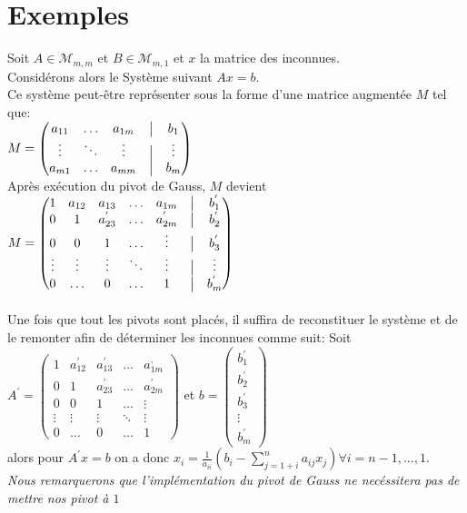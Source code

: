 \section{Exemples}
Soit $A \in \mathcal{M}_{m,m}$ et $B \in \mathcal{M}_{m,1}$ et $x$ la matrice des inconnues. \\
Considérons alors le Système suivant $Ax=b$.\\
Ce système peut-être représenter sous la forme d'une matrice augmentée $M$ tel que:\\
$
M =  \begin{pmatrix}
a_{11}& \ldots & a_{1m} &\bigm| & b_{1} \\
\vdots & \ddots & \vdots&\bigm| &  \vdots \\
a_{m1} & \ldots & a_{mm} &\bigm|& b_{m} 
\end{pmatrix}
$
\\
Après exécution du pivot de Gauss, $M$ devient \\
$
M =  \begin{pmatrix}
1& a_{12}& a_{13} &\ldots & a_{1m} &\bigm| & b_{1}^{'} \\
0 & 1 & a_{23}^{'}&  \ldots &a_{2m}^{'} &\bigm| & b_{2}^{'} \\
0 & 0 & 1 & \ldots &\vdots &\bigm| & b_{3}^{'} \\
\vdots & \vdots & \vdots& \ddots& \vdots &\bigm| &  \vdots \\
0 & \ldots &0 &\ldots &1&\bigm|& b_{m}^{'}
\end{pmatrix}
$  \\ \\
Une fois que tout les pivots sont placés, il suffira de reconstituer le système et de le remonter afin de déterminer les inconnues comme suit:
Soit $A^{'}=  \begin{pmatrix}
1& a_{12}^{'}& a_{13}^{'} &\ldots & a_{1m}^{,} \\
0 & 1 & a_{23}^{'}&  \ldots &a_{2m}^{'} \\
0 & 0 & 1 & \ldots &\vdots\\
\vdots & \vdots & \vdots& \ddots& \vdots \\
0 & \ldots &0 &\ldots &1
\end{pmatrix}
$
et $b = \begin{pmatrix}
b_{1}^{'} \\
b_{2}^{'} \\
b_{3}^{'} \\
\vdots \\
 b_{m}^{'}
\end{pmatrix}
$
\\
alors pour $A^{'}x = b$ on a donc $x_i = \frac{1}{a_{ii}}\left( b_i-\sum\limits_{j=1+i}^n a_{ij}x_j \right) \forall i = n-1, \ldots, 1$. \\
\textit{Nous remarquerons que l'implémentation du pivot de Gauss ne necéssitera pas de mettre nos pivot à $1$}




